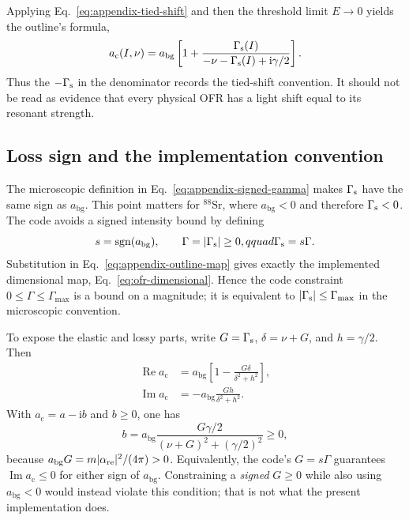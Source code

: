 \documentclass[9pt,a4paper,twocolumn,twoside]{rho-class/rho}
\newcommand{\ac}{a_{\mathrm{c}}}
\newcommand{\abg}{a_{\mathrm{bg}}}
\newcommand{\ii}{\mathrm{i}}
\begin{document}
        Applying Eq.~\eqref{eq:appendix-tied-shift} and then the threshold limit
        $E\rightarrow0$ yields the outline's formula,
        \begin{equation}
            \ac(I,\nu)=\abg\left[1+
            \frac{\Gamma_{\rm s}(I)}
            {-\nu-\Gamma_{\rm s}(I)+\ii\gamma/2}\right].
            \label{eq:appendix-outline-map}
        \end{equation}
        Thus the $-\Gamma_{\rm s}$ in the denominator records the tied-shift
        convention.  It should not be read as evidence that every physical OFR
        has a light shift equal to its resonant strength.

    \subsection{Loss sign and the implementation convention}

        The microscopic definition in Eq.~\eqref{eq:appendix-signed-gamma}
        makes $\Gamma_{\rm s}$ have the same sign as $\abg$.  This point matters
        for $^{88}\mathrm{Sr}$, where $\abg<0$ and therefore
        $\Gamma_{\rm s}<0$.  The code avoids a signed intensity bound by
        defining
        \begin{equation}
            s=\operatorname{sgn}(\abg),\qquad
            \Gamma=|\Gamma_{\rm s}|\geq0,qquad
            \Gamma_{\rm s}=s\Gamma.
            \label{eq:appendix-code-gamma}
        \end{equation}
        Substitution in Eq.~\eqref{eq:appendix-outline-map} gives exactly the
        implemented dimensional map, Eq.~\eqref{eq:ofr-dimensional}.  Hence the
        code constraint $0\leq\Gamma\leq\Gamma_{\max}$ is a bound on a
        magnitude; it is equivalent to
        $|\Gamma_{\rm s}|\leq\Gamma_{\max}$ in the microscopic convention.

        To expose the elastic and lossy parts, write
        $G=\Gamma_{\rm s}$, $\delta=\nu+G$, and $h=\gamma/2$.  Then
        \begin{align}
            \operatorname{Re}\ac
            &=\abg\left[1-
              \frac{G\delta}{\delta^2+h^2}\right],
            \label{eq:appendix-real-ac}\\
            \operatorname{Im}\ac
            &=-\abg\frac{Gh}{\delta^2+h^2}.
            \label{eq:appendix-imag-ac}
        \end{align}
        With $\ac=a-\ii b$ and $b\geq0$, one has
        \begin{equation}
            b=\abg\frac{G\gamma/2}
            {(\nu+G)^2+(\gamma/2)^2}\geq0,
            \label{eq:appendix-loss-length}
        \end{equation}
        because
        $\abg G=m|\alpha_{\rm re}|^2/(4\pi)>0$.  Equivalently, the code's
        $G=s\Gamma$ guarantees $\operatorname{Im}\ac\leq0$ for either sign of
        $\abg$.  Constraining a \emph{signed} $G\geq0$ while also using
        $\abg<0$ would instead violate this condition; that is not what the
        present implementation does.
\end{document}

